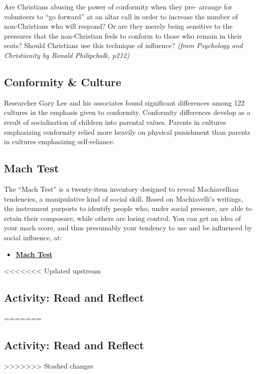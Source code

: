 \documentclass[
]{book}
\providecommand{\tightlist}{%
  \setlength{\itemsep}{0pt}\setlength{\parskip}{0pt}}
\begin{document}
Are Christians abusing the power of conformity when they pre- arrange for volunteers to ``go forward'' at an altar call in order to increase the number of non-Christians who will respond? Or are they merely being sensitive to the pressures that the non-Christian feels to conform to those who remain in their seats? Should Christians use this technique of influence? \emph{(from Psychology and Christianity by Ronald Philipchalk, p212)}

\hypertarget{conformity-culture}{%
\subsection*{Conformity \& Culture}\label{conformity-culture}}

Researcher Gary Lee and his associates found significant differences among 122 cultures in the emphasis given to conformity. Conformity differences de­velop as a result of socialization of children into parental values. Parents in cul­tures emphasizing conformity relied more heavily on physical punishment than parents in cultures emphasizing self-reliance.

\hypertarget{mach-test}{%
\subsection*{Mach Test}\label{mach-test}}

The ``Mach Test'' is a twenty-item inventory designed to reveal Machiavellian tenden­cies, a manipulative kind of social skill. Based on Machiavelli's writings, the in­stru­ment purports to identify people who, under social pressure, are able to retain their composure, while others are losing control. You can get an idea of your mach score, and thus presumably your tendency to use and be influenced by social influence, at:

\begin{itemize}
\tightlist
\item
  \href{https://openpsychometrics.org/tests/MACH-IV/}{\textbf{Mach Test}}
\end{itemize}

<<<<<<< Updated upstream
\hypertarget{activity-read-and-reflect-6}{%
\subsection*{Activity: Read and Reflect}\label{activity-read-and-reflect-6}}
=======
\hypertarget{activity-read-and-reflect-5}{%
\subsection*{Activity: Read and Reflect}\label{activity-read-and-reflect-5}}
>>>>>>> Stashed changes
\end{document}
